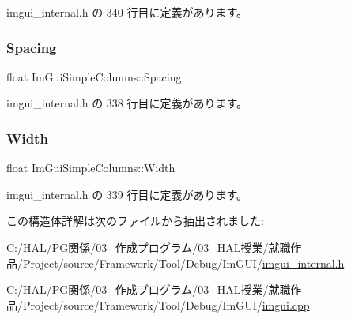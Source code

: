  imgui\+\_\+internal.\+h の 340 行目に定義があります。

\mbox{\label{struct_im_gui_simple_columns_aee2a43067de182ca1aa1447c8b658935}} 
\subsubsection{\texorpdfstring{Spacing}{Spacing}}
{\footnotesize\ttfamily float Im\+Gui\+Simple\+Columns\+::\+Spacing}



 imgui\+\_\+internal.\+h の 338 行目に定義があります。

\mbox{\label{struct_im_gui_simple_columns_a3b7ed6f3aa04e3ead1ea17e4d9f92767}} 
\subsubsection{\texorpdfstring{Width}{Width}}
{\footnotesize\ttfamily float Im\+Gui\+Simple\+Columns\+::\+Width}



 imgui\+\_\+internal.\+h の 339 行目に定義があります。



この構造体詳解は次のファイルから抽出されました\+:\begin{DoxyCompactItemize}
\item 
C\+:/\+H\+A\+L/\+P\+G関係/03\+\_\+作成プログラム/03\+\_\+\+H\+A\+L授業/就職作品/\+Project/source/\+Framework/\+Tool/\+Debug/\+Im\+G\+U\+I/\mbox{\hyperlink{imgui__internal_8h}{imgui\+\_\+internal.\+h}}\item 
C\+:/\+H\+A\+L/\+P\+G関係/03\+\_\+作成プログラム/03\+\_\+\+H\+A\+L授業/就職作品/\+Project/source/\+Framework/\+Tool/\+Debug/\+Im\+G\+U\+I/\mbox{\hyperlink{imgui_8cpp}{imgui.\+cpp}}\end{DoxyCompactItemize}
